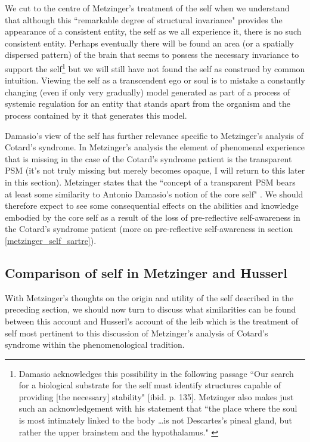 We cut to the centre of Metzinger's treatment of the self when we understand that although this ``remarkable degree of structural invariance" provides the appearance of a consistent entity, the self as we all experience it, there is no such consistent entity. Perhaps eventually there will be found an area (or a spatially dispersed pattern) of the brain that seems to possess the necessary invariance to support the self\footnote{Damasio acknowledges this possibility in the following passage ``Our search for a biological substrate for the self must identify structures capable of providing [the necessary] stability" [ibid. p. 135]. Metzinger also makes just such an acknowledgement with his statement that ``the place where the soul is most intimately linked to the body \ldots is not Descartes's pineal gland, but rather the upper brainstem and the hypothalamus." \cite[p. 292]{metzinger2003}} but we will still have not found the self as construed by common intuition. Viewing the self as a transcendent ego or soul is to mistake a constantly changing (even if only very gradually) model generated as part of a process of systemic regulation for an entity that stands apart from the organism and the process contained by it that generates this model.

Damasio's view of the self has further relevance specific to Metzinger's analysis of Cotard's syndrome. In Metzinger's analysis the element of phenomenal experience that is missing in the case of the Cotard's syndrome patient is the transparent PSM (it's not truly missing but merely becomes opaque, I will return to this later in this section). Metzinger states that the ``concept of a transparent PSM bears at least some similarity to Antonio Damasio's notion of the core self" \cite[p. 340]{metzinger2003}. We should therefore expect to see some consequential effects on the abilities and knowledge embodied by the core self as a result of the loss of pre-reflective self-awareness in the Cotard's syndrome patient (more on pre-reflective self-awareness in section \ref{metzinger_self_sartre}).

\subsection{Comparison of self in Metzinger and Husserl}
\label{metzinger_self_husserl}

With Metzinger's thoughts on the origin and utility of the self described in the preceding section, we should now turn to discuss what similarities can be found between this account and Husserl's account of the leib which is the treatment of self most pertinent to this discussion of Metzinger's analysis of Cotard's syndrome within the phenomenological tradition.

